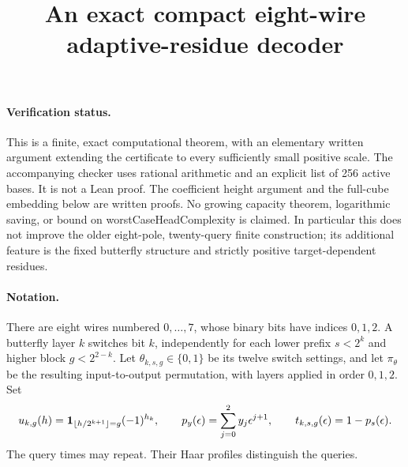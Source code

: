 \documentclass[11pt]{article}
\begin{document}
\title{An exact compact eight-wire adaptive-residue decoder}
\author{}
\date{}
\maketitle

\paragraph{Verification status.}
This is a finite, exact computational theorem, with an elementary written
argument extending the certificate to every sufficiently small positive
scale. The accompanying checker uses rational arithmetic and an explicit
list of 256 active bases. It is not a Lean proof. The coefficient height
argument and the full-cube embedding below are written proofs. No growing
capacity theorem, logarithmic saving, or bound on worstCaseHeadComplexity
is claimed. In particular this does not improve the older eight-pole,
twenty-query finite construction; its additional feature is the fixed
butterfly structure and strictly positive target-dependent residues.

\paragraph{Notation.}
There are eight wires numbered $0,\ldots,7$, whose binary bits have
indices $0,1,2$. A butterfly layer $k$ switches bit $k$, independently
for each lower prefix $s<2^k$ and higher block $g<2^{2-k}$. Let
$\theta_{k,s,g}\in\{0,1\}$ be its twelve switch settings, and let
$\pi_\theta$ be the resulting input-to-output permutation, with layers
applied in order $0,1,2$. Set
\[
 u_{k,g}(h)={\bf1}_{\lfloor h/2^{k+1}\rfloor=g}(-1)^{h_k},\qquad
 p_y(\epsilon)=\sum_{j=0}^2 y_j\epsilon^{j+1},\qquad
 t_{k,s,g}(\epsilon)=1-p_s(\epsilon).
\]
The query times may repeat. Their Haar profiles distinguish the queries.
\end{document}
